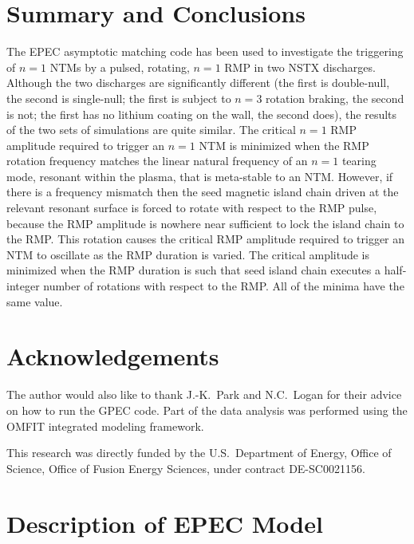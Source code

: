 \documentclass[12pt,prb,aps]{revtex4-1}
\begin{document}
\section{Summary and Conclusions}
The EPEC asymptotic matching code has been used to investigate the triggering of $n=1$ NTMs by a
pulsed, rotating, $n=1$ RMP  in
two NSTX discharges. Although the two discharges are significantly different (the first is double-null, the second is single-null;
the first is subject to $n=3$ rotation braking, the second is not; the first has no lithium coating on the wall, the
second does), the results of the two sets of simulations are quite similar. The critical $n=1$ RMP  amplitude required to
trigger an $n=1$ NTM is minimized when the RMP rotation frequency matches the linear natural frequency of an $n=1$ tearing mode, resonant within the plasma, that is meta-stable to an NTM. However, if there is a frequency mismatch then the seed magnetic island chain driven at the relevant resonant surface is forced to rotate with respect to the RMP pulse, because the RMP amplitude is nowhere near sufficient to lock the island chain to the RMP. 
This rotation causes the critical RMP amplitude required to trigger an NTM to oscillate as the RMP duration is varied. The critical amplitude is
minimized when the RMP duration is such that  seed island chain executes a half-integer number of rotations with respect to the RMP. All of the minima have the same value. 

\section*{Acknowledgements}
The author would also
like to thank J.-K.~Park and N.C.~Logan for their advice on how to run the GPEC code. Part of the data analysis was performed using
the OMFIT integrated modeling framework.\cite{omfit}

This research was directly funded by the U.S.\ Department of Energy, Office of Science, Office of Fusion Energy Sciences, under  contract DE-SC0021156. 

\appendix
\section{Description of EPEC Model}\label{epec}
\end{document}
